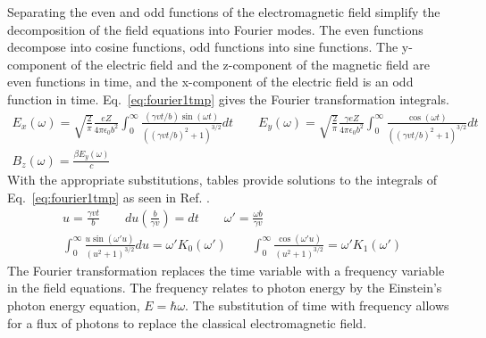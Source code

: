     Separating the even and odd functions of the electromagnetic field simplify
      the decomposition of the field equations into Fourier modes.
    The even functions decompose into cosine functions, odd functions 
      into sine functions. 
    The y-component of the electric field and the z-component of 
      the magnetic field are even functions in time, and the 
      x-component of the electric field is an odd function in time.
    Eq.~\ref{eq:fourier1tmp} gives the Fourier transformation integrals. 
    \begin{eqnarray} \label{eq:fourier1tmp}
        E_{x}(\omega)=\sqrt{\frac{2}{\pi}}\frac{eZ}{4\pi\epsilon_{0}b^{2}}
         \int^{\infty}_{0}\frac{\left(\gamma vt/b\right)\sin
	 \left(\omega t\right)}
	 {\left(\left(\gamma vt/b\right)^{2}+1\right)^{3/2}}dt\qquad
	E_{y}(\omega)=\sqrt{\frac{2}{\pi}}\frac{\gamma eZ}
	 {4\pi\epsilon_{0}b^{2}} \int^{\infty}_{0}\frac{\cos(\omega t)}
	 {\left(\left(\gamma vt/b\right)^{2}+1\right)^{3/2}}dt\nonumber \\
	B_{z}(\omega)=\frac{\beta E_{y}(\omega)}{c}\qquad
    \end{eqnarray}
    With the appropriate substitutions, tables provide 
      solutions to the integrals of Eq.~\ref{eq:fourier1tmp} as seen in 
      Ref. \cite{WWFermi}.
    \begin{eqnarray}  \label{eq:fourier2tmp}
        u=\frac{\gamma v t}{b}\qquad du\left(\frac{b}{\gamma v}\right)=dt\qquad
	 \omega'=\frac{\omega b}{\gamma v}\nonumber \\
	\int^{\infty}_{0}\frac{u \sin(\omega'u)}{\left(u^{2}+1\right)^{3/2}}du
	 =\omega'K_{0}(\omega')\qquad
	\int^{\infty}_{0}\frac{\cos(\omega'u)}{\left(u^{2}+1\right)^{3/2}}
	 =\omega'K_{1}(\omega')
    \end{eqnarray}
    The Fourier transformation replaces the time variable with a frequency 
      variable in the field equations. 
    The frequency relates to photon energy by the Einstein's photon energy  
      equation, $E=\hbar\omega$.
    The substitution of time with frequency allows for a flux of photons 
      to replace the classical electromagnetic field.

